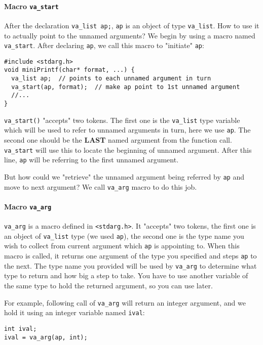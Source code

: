 \documentclass[12pt]{article}
\begin{document}
\paragraph{Macro \texttt{va\_start}}
\label{sec:org9fbf188}
After the declaration \texttt{va\_list ap;}, \texttt{ap} is an object of type \texttt{va\_list}. How to use it to actually point to the unnamed arguments? We begin by using a macro named \texttt{va\_start}. After declaring \texttt{ap}, we call this macro to "initiate" \texttt{ap}:
\begin{verbatim}
#include <stdarg.h>
void miniPrintf(char* format, ...) {
  va_list ap;  // points to each unnamed argument in turn
  va_start(ap, format);  // make ap point to 1st unnamed argument
  //...
}
\end{verbatim}
\texttt{va\_start()} "accepts" two tokens. The first one is the \texttt{va\_list} type variable which will be used to refer to unnamed arguments in turn, here we use \texttt{ap}. The second one should be the \textbf{LAST} named argument from the function call. \texttt{va\_start} will use this to locate the beginning of unnamed argument. After this line, \texttt{ap} will be referring to the first unnamed argument.

But how could we "retrieve" the unnamed argument being referred by \texttt{ap} and move to next argument? We call \texttt{va\_arg} macro to do this job.

\paragraph{Macro \texttt{va\_arg}}
\label{sec:org64cb2b6}
\texttt{va\_arg} is a macro defined in \texttt{<stdarg.h>}. It "accepts" two tokens, the first one is an object of \texttt{va\_list} type (we used \texttt{ap}), the second one is the type name you wish to collect from current argument which \texttt{ap} is appointing to. When this macro is called, it returns one argument of the type you specified and steps \texttt{ap} to the next. The type name you provided will be used by \texttt{va\_arg} to determine what type to return and how big a step to take. You have to use another variable of the same type to hold the returned argument, so you can use later.

For example, following call of \texttt{va\_arg} will return an integer argument, and we hold it using an integer variable named \texttt{ival}:
\begin{verbatim}
int ival;
ival = va_arg(ap, int);
\end{verbatim}
\end{document}
